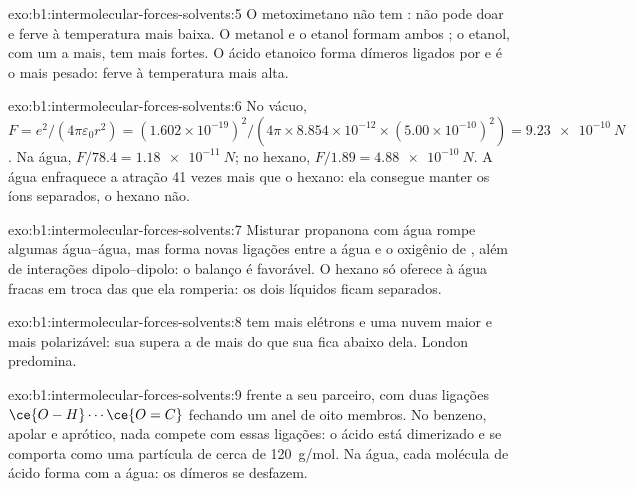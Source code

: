 \begin{solution}{exo:b1:intermolecular-forces-solvents:5}
O metoximetano não tem : não pode doar  e
ferve à temperatura mais baixa. O metanol e o etanol formam ambos
; o etanol, com um  a mais, tem  mais fortes. O ácido etanoico forma dímeros ligados por
 e é o mais pesado: ferve à temperatura mais alta.
\end{solution}

\begin{solution}{exo:b1:intermolecular-forces-solvents:6}
No vácuo, $F = e^2/(4\pi\varepsilon_0 r^2) = (1.602 \times
10^{-19})^2/(4\pi \times 8.854 \times 10^{-12} \times (5.00 \times
10^{-10})^2) = \qty{9.23e-10}{N}$. Na água, $F/78.4 = \qty{1.18e-11}{N}$;
no hexano, $F/1.89 = \qty{4.88e-10}{N}$. A água enfraquece a atração 41
vezes mais que o hexano: ela consegue manter os íons separados, o hexano não.
\end{solution}

\begin{solution}{exo:b1:intermolecular-forces-solvents:7}
Misturar propanona com água rompe algumas 
água--água, mas forma novas ligações entre a água e o oxigênio de
, além de interações dipolo--dipolo: o balanço é favorável. O
hexano só oferece à água fracas  em troca das
 que ela romperia: os dois líquidos ficam separados.
\end{solution}

\begin{solution}{exo:b1:intermolecular-forces-solvents:8}
 tem mais elétrons e uma nuvem maior e mais polarizável: sua
 supera a de  mais do que sua  fica abaixo dela. London predomina.
\end{solution}

\begin{solution}{exo:b1:intermolecular-forces-solvents:9}
 frente a seu parceiro, com duas
ligações $\ce{O-H}\cdots\ce{O=C}$ fechando um anel de oito membros. No
benzeno, apolar e aprótico, nada compete com essas ligações: o ácido está
dimerizado e se comporta como uma partícula de cerca de \qty{120}{g/mol}.
Na água, cada molécula de ácido forma  com a água:
os dímeros se desfazem.
\end{solution}

